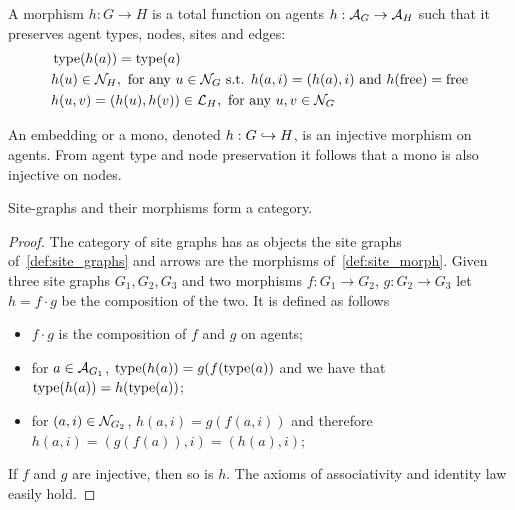 \begin{definition}
\label{def:site_morph}
A morphism $h:G\to H$ is a total function on agents $h:\mathcal{A}_G\to\mathcal{A}_H$ such that it preserves agent types, nodes, sites and edges:
  \begin{align*}
    &\operatorname{type}(h(a))=\operatorname{type}(a)\\
    &h(u)\in\mathcal{N}_H,\text{ for any }u\in\mathcal{N}_G\text{ s.t. }
    h(a,i) = (h(a),i) \text{ and }
    h(\text{free})=\text{free}\\
    &h(u,v) = (h(u), h(v))\in\mathcal{L}_H,\text{ for any }u,v\in\mathcal{N}_G
  \end{align*}
\end{definition}
An embedding or a mono, denoted $h:G\hookrightarrow H$, is an injective morphism on agents. From agent type and node preservation it follows that a mono is also injective on nodes.

\begin{lemma}
  Site-graphs and their morphisms form a category.
\end{lemma}
\begin{proof}
  The category of site graphs has as objects the site graphs of~\autoref{def:site_graphs} and arrows are the morphisms of~\autoref{def:site_morph}.
%
  Given three site graphs $G_1,G_2,G_3$ and two morphisms $f:G_1\to G_2$, $g:G_2\to G_3$ let $h=f\cdot g$ be the composition of the two. It is defined as follows
  \begin{itemize}
  \item $f\cdot g$ is the composition of $f$ and $g$ on agents;
  \item for $a\in\mathcal{A}_{G_1}$, $\operatorname{type}(h(a))=g(f(\operatorname{type}(a))$ and we have that $\operatorname{type}(h(a))=h(\operatorname{type}(a))$;
  \item for $(a,i)\in\mathcal{N}_{G_2}$, $h(a,i) = g(f(a,i))$ and therefore $h(a,i)=(g(f(a)),i)=(h(a),i)$;
  \end{itemize}
  If $f$ and $g$ are injective, then so is $h$.
%
  The axioms of associativity and identity law easily hold.
\end{proof}

